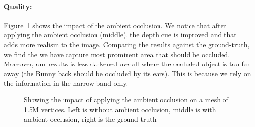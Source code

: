 \documentclass[a4paper,10pt]{article}
\begin{document}
\paragraph{Quality:} 

Figure~\ref{fig:bunny_ao} shows the impact of the ambient occlusion. We notice that after applying the ambient occlusion (middle), the depth cue is improved and that adds more realism to the image. Comparing the results against the ground-truth, we find the we have capture most prominent area that should be occluded. Moreover, our results is less darkened overall where the occluded object is too far away (the Bunny back should be occluded by its ears). This is because we rely on the information in the narrow-band only.

\begin{figure}[!tbh]
\centering        
   \caption{Showing the impact of applying the ambient occlusion on a mesh of 1.5M vertices. Left is without ambient occlusion, middle is with ambient occlusion, right is the ground-truth}
   \label{fig:bunny_ao}
\end{figure}
\end{document}
